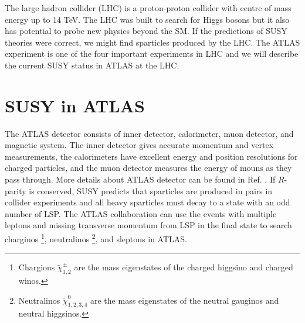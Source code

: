 \documentclass[12pt]{report}
\begin{document}
The large hadron collider (LHC) is a proton-proton collider with centre of mass energy up to 14 TeV.
The LHC was built to search for Higgs bosons but it also has potential to probe new physics beyond the SM.
If the predictions of SUSY theories were correct, we might find sparticles produced by the LHC.
The ATLAS experiment is one of the four important experiments in LHC and we will describe the current SUSY status in ATLAS at the LHC.



\section{SUSY in ATLAS}
The ATLAS detector consists of inner detector, calorimeter, muon detector, and magnetic system.
The inner detector gives accurate momentum and vertex measurements, the calorimeters have excellent energy and position resolutions for charged particles, and the muon detector measures the energy of mouns as they pass through.
More details about ATLAS detector can be found in Ref. \cite{atlas detector}.
If $R$-parity is conserved, SUSY predicts that sparticles are produced in pairs in collider experiments and all heavy sparticles must decay to a state with an odd number of LSP.
The ATLAS collaboration can use the events with multiple leptons and missing transverse momentum from LSP in the final state to search charginos \footnote{Chargions $\widetilde{\chi}^{\pm}_{1, 2}$ are the mass eigenstates of the charged higgsino and charged winos.}, neutralinos \footnote{Neutralinos $\widetilde{\chi}^{0}_{1,2,3,4}$ are the mass eigenstates of the neutral gauginos and neutral higgsinos.}, and sleptons in ATLAS.
\end{document}
